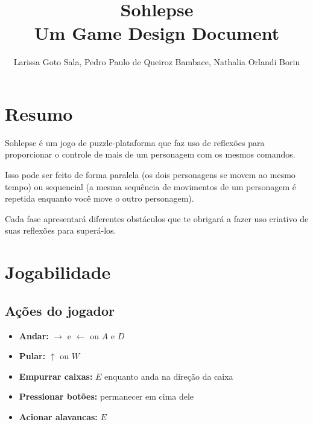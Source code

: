 \documentclass[a4paper, 11pt]{article}
\title{\textbf{Sohlepse} \\ \small{Um Game Design Document}}
\author{Larissa Goto Sala, Pedro Paulo de Queiroz Bambace, Nathalia Orlandi Borin}
\begin{document}
 
 
\maketitle 
 
\newpage 
 
\newpage 
 
\section{Resumo} 
	 
	Sohlepse é um jogo de puzzle-plataforma que faz uso de reflexões para proporcionar o controle de mais de um personagem com os mesmos comandos. 
 
Isso pode ser feito de forma paralela (os dois personagens se movem ao mesmo tempo) ou sequencial (a mesma sequência de movimentos de um personagem é repetida enquanto você move o outro personagem). 
 
Cada fase apresentará diferentes obstáculos que te obrigará a fazer uso criativo de suas reflexões para superá-los. 
 
\section{Jogabilidade} 
 
	\subsection{Ações do jogador} 
		\begin{itemize} 
			\item \textbf{Andar:} $\rightarrow$ e $\leftarrow$ ou $A$ e $D$  
			\item \textbf{Pular:} $\uparrow$ ou $W$
			\item \textbf{Empurrar caixas:} $E$ enquanto anda na direção da caixa  
			\item \textbf{Pressionar botões:} permanecer em cima dele 
			\item \textbf{Acionar alavancas:} $E$
		\end{itemize} 
 
\end{document}
